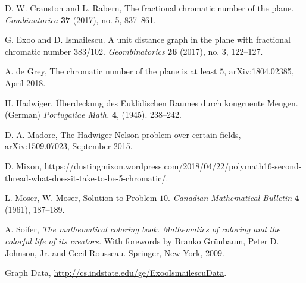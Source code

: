 \documentclass [11pt,oneside]{amsart}
\theoremstyle{definition}
\theoremstyle{plain}
\begin{document}
\begin{thebibliography}{References}

 D. W. Cranston and L. Rabern, The fractional chromatic number of the plane. \emph{Combinatorica} {\bf  37} (2017), no. 5, 837--861.

 G. Exoo and D. Ismailescu. A unit distance graph in the plane with fractional chromatic number 383/102. \emph{Geombinatorics} {\bf 26} (2017), no. 3, 122--127.

 A. de Grey, The chromatic number of the plane is at least $5$, arXiv:1804.02385, April 2018.

 H. Hadwiger,  \"{U}berdeckung des Euklidischen Raumes durch kongruente Mengen. (German) \emph{Portugaliae Math.} {\bf 4}, (1945). 238--242.

 D. A. Madore, The Hadwiger-Nelson problem over certain fields, arXiv:1509.07023, September 2015.

 D. Mixon, https://dustingmixon.wordpress.com/2018/04/22/polymath16-second-thread-what-does-it-take-to-be-5-chromatic/.

 L. Moser, W. Moser, Solution to Problem $10$. {\it Canadian Mathematical Bulletin} {\bf 4} (1961), 187--189.

 A. Soifer, {\it  The mathematical coloring book. Mathematics of coloring and the colorful life of its creators.} With forewords by Branko Gr\"{u}nbaum, Peter D. Johnson, Jr. and Cecil Rousseau. Springer, New York, 2009.

 Graph Data, \url{http://cs.indstate.edu/ge/ExooIsmailescuData}.
\end{thebibliography}
\end{document}

